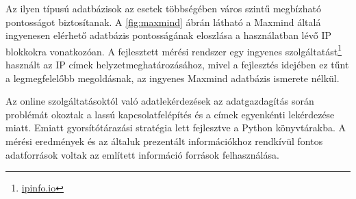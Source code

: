  Az ilyen típusú adatbázisok az esetek többségében város szintű megbízható pontosságot biztosítanak. A \ref{fig:maxmind} ábrán látható a Maxmind általá ingyenesen elérhető adatbázis pontosságának eloszlása a használatban lévő IP blokkokra vonatkozóan.
A fejlesztett mérési rendszer egy ingyenes szolgáltatást\footnote{\href{https://ipinfo.io}{ipinfo.io}} használt az IP címek helyzetmeghatározásához, mivel a fejlesztés idejében ez tűnt a legmegfelelőbb megoldásnak, az ingyenes Maxmind adatbázis ismerete nélkül.

\pagebreak

Az online szolgáltatásoktól való adatlekérdezések az adatgazdagítás során problémát okoztak a lassú kapcsolatfelépítés és a címek egyenkénti lekérdezése miatt. Emiatt gyorsítótárazási stratégia lett fejlesztve a Python könyvtárakba.
A mérési eredmények és az általuk prezentált információkhoz rendkívül fontos adatforrások voltak az említett információ források felhasználása.
